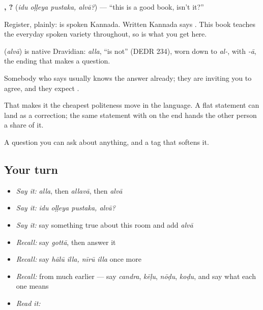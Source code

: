 \textbf{  , ?} (\emph{idu oḷḷeya pustaka, alvā?}) — \textquotedblleft{}this is a good book, isn't it?\textquotedblright{}

Register, plainly:  is spoken Kannada. Written Kannada says . This book teaches the everyday spoken variety throughout, so  is what you get here.

\begin{cousinweb}
\textbf{} (\emph{alvā}) is native Dravidian: \emph{alla}, \textquotedblleft{}is not\textquotedblright{} (DEDR 234), worn down to \emph{al-}, with \emph{-ā}, the ending that makes a question.
\end{cousinweb}

\begin{grammarlens}[title={Grammar Lens: asking for agreement, not information}]
Somebody who says  usually knows the answer already; they are inviting you to agree, and they expect .

That makes it the cheapest politeness move in the language. A flat statement can land as a correction; the same statement with  on the end hands the other person a share of it.
\end{grammarlens}

\begin{grammarlens}[title={What you've built}]
A question you can ask about anything, and a tag that softens it.
\end{grammarlens}

\subsection*{Your turn}
\begin{itemize}
\raggedright
  \item \emph{Say it:} \emph{alla}, then \emph{allavā}, then \emph{alvā}
  \item \emph{Say it:} \emph{idu oḷḷeya pustaka, alvā?}
  \item \emph{Say it:} say something true about this room and add \emph{alvā}
  \item \emph{Recall:} say \emph{gottā}, then answer it
  \item \emph{Recall:} say \emph{hālū illa, nīrū illa} once more
  \item \emph{Recall:} from much earlier — say \emph{candra}, \emph{kēḷu}, \emph{nōḍu}, \emph{koḍu}, and say what each one means
  \item \emph{Read it:} \textbf{}
\end{itemize}

